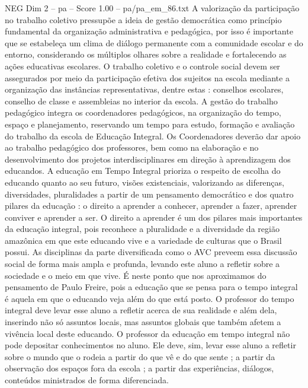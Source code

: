 \begin{textsample}{NEG Dim 2 – pa – Score 1.00 – pa/pa\_em\_86.txt}  \label{ex:f2_neg_222}
A valorização da participação no trabalho coletivo pressupõe a ideia de gestão democrática como princípio fundamental da organização administrativa e pedagógica, por isso é importante que se estabeleça um clima de diálogo permanente com a comunidade escolar e do entorno, considerando os múltiplos olhares sobre a realidade e fortalecendo as ações educativas escolares.
O trabalho coletivo e o controle social devem ser assegurados por meio da participação efetiva dos sujeitos na escola mediante a organização das instâncias representativas, dentre estas : conselhos escolares, conselho de classe e assembleias no interior da escola.
A gestão do trabalho pedagógico integra os coordenadores pedagógicos, na organização do tempo, espaço e planejamento, reservando um tempo para estudo, formação e avaliação do trabalho da escola de Educação Integral.
Os Coordenadores deverão dar apoio ao trabalho pedagógico dos professores, bem como na elaboração e no desenvolvimento dos projetos interdisciplinares em direção à aprendizagem dos educandos.
A educação em Tempo Integral prioriza o respeito de escolha do educando quanto ao seu futuro, visões existenciais, valorizando as diferenças, diversidades, pluralidades a partir de um pensamento democrático e dos quatro pilares da educação : o direito a aprender a conhecer, aprender a fazer, aprender conviver e aprender a ser.
O direito a aprender é um dos pilares mais importantes da educação integral, pois reconhece a pluralidade e a diversidade da região amazônica em que este educando vive e a variedade de culturas que o Brasil possui.
As disciplinas da parte diversificada como o AVC preveem essa discussão social de forma mais ampla e profunda, levando este aluno a refletir sobre a sociedade e o meio em que vive.
É neste ponto que nos aproximamos do pensamento de Paulo Freire, pois a educação que se pensa para o tempo integral é aquela em que o educando veja além do que está posto.
O professor do tempo integral deve levar esse aluno a refletir acerca de sua realidade e além dela, inserindo não só assuntos locais, mas assuntos globais que também afetem a vivência local deste educando.
O professor da educação em tempo integral não pode depositar conhecimentos no aluno.
Ele deve, sim, levar esse aluno a refletir sobre o mundo que o rodeia a partir do que vê e do que sente ; a partir da observação dos espaços fora da escola ; a partir das experiências, diálogos, conteúdos ministrados de forma diferenciada.

\end{textsample}
